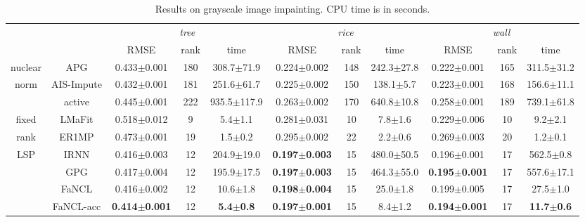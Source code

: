 \documentclass[10pt,journal,compsoc]{IEEEtran}
\begin{document}
\begin{table*}[ht]
\centering
\caption{Results on grayscale image impainting. CPU time is in seconds.}
\vspace{-10px}

\begin{tabular}{c|c|c c c|c c c|c c c}
	\hline
	        &                     &           \multicolumn{3}{c|}{\textit{tree}}           &        \multicolumn{3}{c|}{\textit{rice}}        &            \multicolumn{3}{c}{\textit{wall}}            \\
	        &                     &           RMSE           & rank &         time         &           RMSE           & rank &      time      &           RMSE           & rank &         time          \\ \hline
	nuclear &    \textsf{APG}     &     0.433$\pm$0.001      & 180  &    308.7$\pm$71.9    &     0.224$\pm$0.002      & 148  & 242.3$\pm$27.8 &     0.222$\pm$0.001      & 165  &    311.5$\pm$31.2     \\ \cline{2-11}
	 norm   & \textsf{AIS-Impute} &     0.432$\pm$0.001      & 181  &    251.6$\pm$61.7    &     0.225$\pm$0.002      & 150  & 138.1$\pm$5.7  &     0.223$\pm$0.001      & 168  &    156.6$\pm$11.1     \\ \cline{2-11}
	        &   \textsf{active}   &     0.445$\pm$0.001      & 222  &   935.5$\pm$117.9    &     0.263$\pm$0.002      & 170  & 640.8$\pm$10.8 &     0.258$\pm$0.001      & 189  &    739.1$\pm$61.8     \\ \hline\hline
	 fixed  &   \textsf{LMaFit}   &     0.518$\pm$0.012      &  9   &     5.4$\pm$1.1      &     0.281$\pm$0.031      &  10  &  7.8$\pm$1.6   &     0.229$\pm$0.006      &  10  &      9.2$\pm$2.1      \\ \cline{2-11}
	 rank   &   \textsf{ER1MP}    &     0.473$\pm$0.001      &  19  &     1.5$\pm$0.2      &     0.295$\pm$0.002      &  22  &  2.2$\pm$0.6   &     0.269$\pm$0.003      &  20  &      1.2$\pm$0.1      \\ \hline\hline
	  LSP   &    \textsf{IRNN}    &     0.416$\pm$0.003      &  12  &    204.9$\pm$19.0    & \textbf{0.197$\pm$0.003} &  15  & 480.0$\pm$50.5 &     0.196$\pm$0.001      &  17  &     562.5$\pm$0.8     \\ \cline{2-11}
	        &    \textsf{GPG}     &     0.417$\pm$0.004      &  12  &    195.9$\pm$17.5    & \textbf{0.197$\pm$0.003} &  15  & 464.3$\pm$55.0 & \textbf{0.195$\pm$0.001} &  17  &    557.6$\pm$17.1     \\ \cline{2-11}
	        &   \textsf{FaNCL}    &     0.416$\pm$0.002      &  12  &     10.6$\pm$1.8     & \textbf{0.198$\pm$0.004} &  15  &  25.0$\pm$1.8  &     0.199$\pm$0.005      &  17  &     27.5$\pm$1.0      \\ \cline{2-11}
	        & \textsf{FaNCL-acc}  & \textbf{0.414$\pm$0.001} &  12  & \textbf{5.4$\pm$0.8} & \textbf{0.197$\pm$0.001} &  15  &  8.4$\pm$1.2   & \textbf{0.194$\pm$0.001} &  17  & \textbf{11.7$\pm$0.6} \\ \hline
\end{tabular}
\label{tab:gray}
\end{table*}
\end{document}
